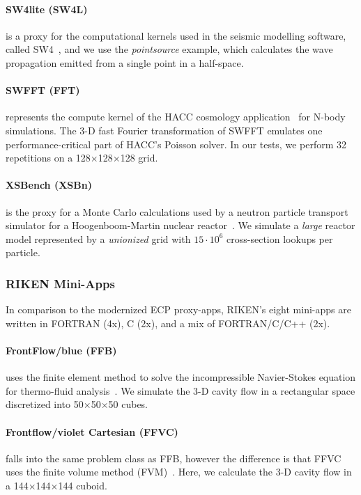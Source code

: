 \paragraph{SW4lite (SW4L)} is a proxy for the computational kernels used in the seismic modelling
software, called SW4~\cite{petersson_users_2017}, and we use the \textit{pointsource} example, which calculates the wave
propagation emitted from a single point in a half-space.

\paragraph{SWFFT (FFT)} represents the compute kernel of the HACC cosmology application~\cite{habib_hacc:_2016}
for N-body simulations. The 3-D fast Fourier transformation of SWFFT emulates
one performance-critical part of HACC's Poisson solver. In our tests, we perform 32 repetitions on a
128$\times$128$\times$128 grid.

\paragraph{XSBench (XSBn)} is the proxy for a Monte Carlo calculations used by a neutron particle transport
simulator for a Hoogenboom-Martin nuclear reactor~\cite{tramm_xsbench_2014}. We simulate a \textit{large} reactor model
represented by a \textit{unionized} grid with $15\cdot10^6$ cross-section lookups per particle.


\subsubsection{RIKEN Mini-Apps}\label{ssec:postk}
In comparison to the modernized ECP proxy-apps, RIKEN's eight mini-apps are written in
FORTRAN (4x), C (2x), and a mix of FORTRAN/C/C++ (2x).

\paragraph{FrontFlow/blue (FFB)} uses the finite element method to solve the incompressible Navier-Stokes
equation for thermo-fluid analysis~\cite{guo_basic_2006}.
We simulate the 3-D cavity flow in a rectangular space discretized into 50$\times$50$\times$50 cubes.

\paragraph{Frontflow/violet Cartesian (FFVC)} falls into the same problem class as
FFB, however the difference is that FFVC uses the finite volume method (FVM)~\cite{ono_ffv-c_nodate}.
Here, we calculate the 3-D cavity flow in a 144$\times$144$\times$144 cuboid.

